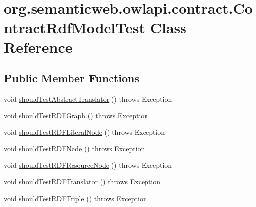 \hypertarget{classorg_1_1semanticweb_1_1owlapi_1_1contract_1_1_contract_rdf_model_test}{\section{org.\-semanticweb.\-owlapi.\-contract.\-Contract\-Rdf\-Model\-Test Class Reference}
\label{classorg_1_1semanticweb_1_1owlapi_1_1contract_1_1_contract_rdf_model_test}
}
\subsection*{Public Member Functions}
\begin{DoxyCompactItemize}
\item 
void \hyperlink{classorg_1_1semanticweb_1_1owlapi_1_1contract_1_1_contract_rdf_model_test_a5d0c8f765522a116cb2318ddba7b49fa}{should\-Test\-Abstract\-Translator} ()  throws Exception 
\item 
void \hyperlink{classorg_1_1semanticweb_1_1owlapi_1_1contract_1_1_contract_rdf_model_test_a8fa287713bc99a531e3b3f51b513de0c}{should\-Test\-R\-D\-F\-Graph} ()  throws Exception 
\item 
void \hyperlink{classorg_1_1semanticweb_1_1owlapi_1_1contract_1_1_contract_rdf_model_test_a6e9a51f8f6b3609680840881ad97f901}{should\-Test\-R\-D\-F\-Literal\-Node} ()  throws Exception 
\item 
void \hyperlink{classorg_1_1semanticweb_1_1owlapi_1_1contract_1_1_contract_rdf_model_test_a593c76021252e012936541c49a3583bf}{should\-Test\-R\-D\-F\-Node} ()  throws Exception 
\item 
void \hyperlink{classorg_1_1semanticweb_1_1owlapi_1_1contract_1_1_contract_rdf_model_test_a6ffe244b2575303d7425dfe7c5fa3c9e}{should\-Test\-R\-D\-F\-Resource\-Node} ()  throws Exception 
\item 
void \hyperlink{classorg_1_1semanticweb_1_1owlapi_1_1contract_1_1_contract_rdf_model_test_a01600f988d8133e8985b1c3ed240c090}{should\-Test\-R\-D\-F\-Translator} ()  throws Exception 
\item 
void \hyperlink{classorg_1_1semanticweb_1_1owlapi_1_1contract_1_1_contract_rdf_model_test_ad9212ef73c6c9837bd096f3bcbedfa93}{should\-Test\-R\-D\-F\-Triple} ()  throws Exception 
\end{DoxyCompactItemize}


